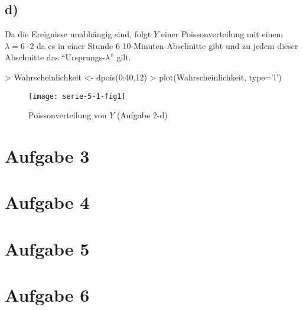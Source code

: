 \subsection*{d)}
Da die Ereignisse unabhängig sind, folgt $Y$ einer Poissonverteilung mit
einem $\lambda = 6 \cdot 2$ da es in einer Stunde 6 10-Minuten-Abschnitte gibt
und zu jedem dieser Abschnitte das ``Ursprungs-$\lambda$'' gilt.
\begin{Schunk}
\begin{Sinput}
> Wahrscheinlichkeit <- dpois(0:40,12)
> plot(Wahrscheinlichkeit, type='l')
\end{Sinput}
\end{Schunk}
\begin{figure}[h]
\begin{center}
\texttt{[image: serie-5-1-fig1]}
\caption{Poissonverteilung von $Y$ (Aufgabe 2-d)}
\end{center}
\end{figure}

\section{Aufgabe 3}
\section{Aufgabe 4}
\section{Aufgabe 5}
\section{Aufgabe 6}
